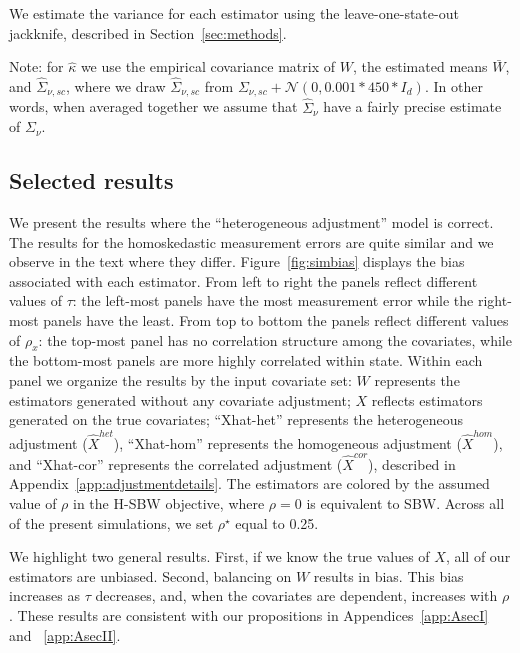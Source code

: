 We estimate the variance for each estimator using the leave-one-state-out jackknife, described in Section~\ref{sec:methods}. 

Note: for $\hat{\kappa}$ we use the empirical covariance matrix of $W$, the estimated means $\bar{W}$, and $\hat{\Sigma}_{\nu, sc}$, where we draw $\hat{\Sigma}_{\nu, sc}$ from $\Sigma_{\nu, sc} + \mathcal{N}(0, 0.001*450*I_d)$. In other words, when averaged together we assume that $\hat{\Sigma}_{\nu}$ have a fairly precise estimate of $\Sigma_{\nu}$.

\subsection{Selected results}\label{ssec:resultsI}

We present the results where the ``heterogeneous adjustment'' model is correct. The results for the homoskedastic measurement errors are quite similar and we observe in the text where they differ. Figure~\ref{fig:simbias} displays the bias associated with each estimator. From left to right the panels reflect different values of $\tau$: the left-most panels have the most measurement error while the right-most panels have the least. From top to bottom the panels reflect different values of $\rho_x$: the top-most panel has no correlation structure among the covariates, while the bottom-most panels are more highly correlated within state. Within each panel we organize the results by the input covariate set: $W$ represents the estimators generated without any covariate adjustment; $X$ reflects estimators generated on the true covariates; ``Xhat-het'' represents the heterogeneous adjustment ($\hat{X}^{het}$), ``Xhat-hom'' represents the homogeneous adjustment ($\hat{X}^{hom}$), and ``Xhat-cor'' represents the correlated adjustment ($\hat{X}^{cor}$), described in Appendix~\ref{app:adjustmentdetails}. The estimators are colored by the assumed value of $\rho$ in the H-SBW objective, where $\rho = 0$ is equivalent to SBW. Across all of the present simulations, we set $\rho^\star$ equal to 0.25.

We highlight two general results. First, if we know the true values of $X$, all of our estimators are unbiased. Second, balancing on $W$ results in bias. This bias increases as $\tau$ decreases, and, when the covariates are dependent, increases with $\rho$. These results are consistent with our propositions in Appendices~\ref{app:AsecI} and ~\ref{app:AsecII}.

